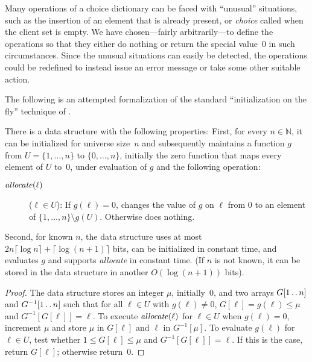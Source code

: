 \documentclass[envcountsame,envcountsect,undated,nolinenumbers]{lnthi}
\def\Tvn#1{\hbox{\textit{#1\/}}}
\def\Tceil#1{\lceil #1\rceil}
\def\TbbbN{\mathbb{N}}
\def\Ttwodots{\mathinner{\ldotp\ldotp}}\def\Tsup#1{^{\mbox{\scriptsize #1}}}\gdef\Tsub#1{_{\mbox{\scriptsize #1}}}\def\cchoice{\overline{\Tvn{choice}}}
\begin{document}
Many operations of a choice dictionary can be faced
with ``unusual'' situations, such as the insertion of
an element that is already present, or \Tvn{choice}
called when the client set is empty.
We have chosen---fairly arbitrarily---to define the
operations so that they either do nothing or return
the special value~0 in such circumstances.
Since the unusual situations can easily be detected,
the operations could be redefined to instead issue an
error message or take some other suitable action.

The following is an attempted formalization
of the standard
``initialization on the fly''
technique of \cite[Exercise 2.12]{AhoHU74}.

\begin{lemma}
\label{lem:2.12}There is a data structure with the following
properties:
First, for every $n\in\TbbbN$, it can be
initialized for universe size~$n$ and
subsequently maintains
a function $g$ from
$U=\{1,\ldots,n\}$ to $\{0,\ldots,n\}$,
initially the zero function that maps every
element of $U$ to~0,
under evaluation of $g$
and the following operation:

\begin{description}
\item[\normalfont$\Tvn{allocate}(\ell)$]
($\ell\in U$):
If $g(\ell)=0$,
changes the value of $g$ on $\ell$ from 0 to
an element of $\{1,\ldots,n\}\setminus g(U)$.
Otherwise does nothing.
\end{description}

\noindent
Second, for known $n$, the data structure uses at most
$2 n\Tceil{\log n}+\Tceil{\log(n+1)}$ bits, can be initialized
in constant time, and evaluates $g$ and
supports \Tvn{allocate} in constant time.
(If $n$ is not known, it can be stored in the
data structure in another $O(\log(n+1))$ bits).
\end{lemma}

\begin{proof}
The data structure stores an integer $\mu$,
initially~0, and two arrays
$G[1\Ttwodots n]$ and $G^{-1}[1\Ttwodots n]$ such that
for all $\ell\in U$ with $g(\ell)\not=0$,
$G[\ell]=g(\ell)\le\mu$ and $G^{-1}[G[\ell]]=\ell$.
To execute $\Tvn{allocate}(\ell)$ for $\ell\in U$
when $g(\ell)=0$, increment $\mu$ and store $\mu$ in $G[\ell]$ and
$\ell$ in $G^{-1}[\mu]$.
To evaluate $g(\ell)$ for $\ell\in U$, test whether
$1\le G[\ell]\le \mu$ and $G^{-1}[G[\ell]]=\ell$.
If this is the case, return $G[\ell]$;
otherwise return~0.
\end{proof}
\end{document}
